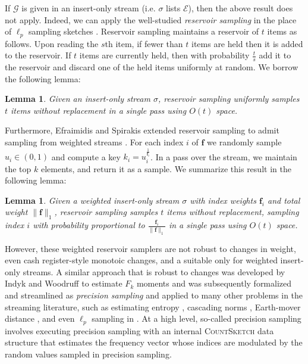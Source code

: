 \documentclass[10]{report}
\newtheorem{lemma}[theorem]{Lemma}
\newcommand{\algoname}[1]{\textnormal{\textsc{#1}}}
\begin{document}
If $\mathcal{G}$ is given in an insert-only stream (i.e. $\sigma$ lists $\mathcal{E}$), then the above result does not apply.
Indeed, we can apply the well-studied \emph{reservoir sampling} in the place of $\ell_p$ sampling sketches \cite{vitter1985random}.
Reservoir sampling maintains a reservoir of $t$ items as follows. 
Upon reading the $s$th item, if fewer than $t$ items are held then it is added to the reservoir.
If $t$ items are currently held, then with probability $\frac{t}{s}$ add it to the reservoir and discard one of the held items uniformly at random.
We borrow the following lemma:
%
\begin{lemma} \label{lem:reservoir}
Given an insert-only stream $\sigma$, reservoir sampling uniformly samples $t$ items without replacement in a single pass using $O(t)$ space. 
\end{lemma}
%

Furthermore, Efraimidis and Spirakis extended reservoir sampling to admit sampling from weighted streams \cite{efraimidis2006weighted}.
For each index $i$ of $\mathbf{f}$ we randomly sample $u_i \in (0,1)$ and compute a key $k_i = u_i ^ {\frac{1}{\mathbf{f}_i}}$.
In a pass over the stream, we maintain the top $k$ elements, and return it as a sample.
We summarize this result in the following lemma:
%
\begin{lemma} \label{lem:reservoir:weighted}
Given a weighted insert-only stream $\sigma$ with index weights $\mathbf{f}_i$ and total weight $\|\mathbf{f}\|_1$, reservoir sampling samples $t$ items without replacement, sampling index $i$ with probability proportional to $\frac{\mathbf{f}_i}{\|\mathbf{f}\|_1}$ in a single pass using $O(t)$ space. 
\end{lemma}
%

However, these weighted reservoir samplers are not robust to changes in weight, even cash register-style monotoic changes, and a suitable only for weighted insert-only streams.
A similar approach that is robust to changes was developed by Indyk and Woodruff to estimate $F_k$ moments \cite{indyk2005optimal} and was subsequently formalized and streamlined as \emph{precision sampling} \cite{andoni2011streaming} and applied to many other problems in the streaming literature, such as estimating entropy \cite{bhuvanagiri2006estimating}, cascading norms \cite{jayram2009data}, Earth-mover distance \cite{andoni2009efficient}, and even $\ell_p$ sampling in \cite{monemizadeh20101, jowhari2011tight}. 
At a high level, so-called precision sampling involves executing precision sampling with an internal \algoname{CountSketch} data structure that estimates the frequency vector whose indices are modulated by the random values sampled in precision sampling. 
 
\end{document}
